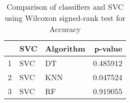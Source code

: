\begin{table}
\footnotesize
\caption{Comparison of classifiers and SVC using Wilcoxon signed-rank test for Accuracy}
\label{tab:SVC wilcoxon Accuracy comparison}
\begin{tabular}{lllr}
\hline
 & SVC & Algorithm & p-value \\
\hline
1 & SVC & DT & 0.485912 \\
2 & SVC & KNN & 0.047524 \\
3 & SVC & RF & 0.919055 \\
\hline
\end{tabular}
\end{table}
